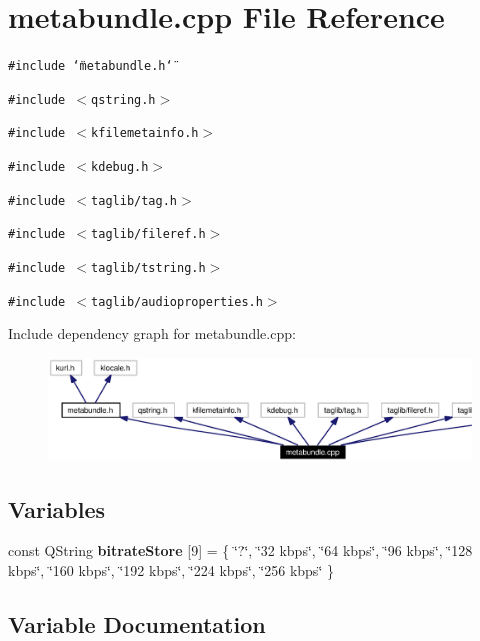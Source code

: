 \section{metabundle.cpp File Reference}
\label{metabundle_8cpp}


{\tt \#include \char`\"{}metabundle.h\char`\"{}}\par
{\tt \#include $<$qstring.h$>$}\par
{\tt \#include $<$kfilemetainfo.h$>$}\par
{\tt \#include $<$kdebug.h$>$}\par
{\tt \#include $<$taglib/tag.h$>$}\par
{\tt \#include $<$taglib/fileref.h$>$}\par
{\tt \#include $<$taglib/tstring.h$>$}\par
{\tt \#include $<$taglib/audioproperties.h$>$}\par


Include dependency graph for metabundle.cpp:\begin{figure}[H]
\begin{center}
\leavevmode
\includegraphics[width=393pt]{metabundle_8cpp__incl}
\end{center}
\end{figure}
\subsection*{Variables}
\begin{CompactItemize}
\item 
const QString {\bf bitrate\-Store} [9] = \{ \char`\"{}?\char`\"{}, \char`\"{}32 kbps\char`\"{}, \char`\"{}64 kbps\char`\"{}, \char`\"{}96 kbps\char`\"{}, \char`\"{}128 kbps\char`\"{}, \char`\"{}160 kbps\char`\"{}, \char`\"{}192 kbps\char`\"{}, \char`\"{}224 kbps\char`\"{}, \char`\"{}256 kbps\char`\"{} \}
\end{CompactItemize}


\subsection{Variable Documentation}
